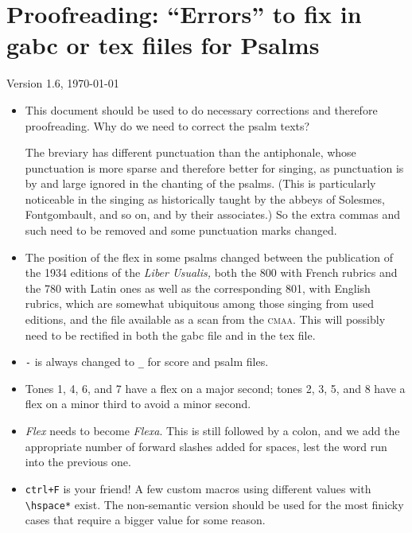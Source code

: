 \documentclass[11pt]{article}
\begin{document}
 \section{Proofreading: ``Errors'' to fix in gabc or tex fiiles for Psalms}
 
 {\centering Version 1.6, \today\par}
 
\begin{itemize}
 \item
 This document should be used to do necessary corrections and therefore proofreading. Why do we need to correct the psalm texts?
 
The breviary has different punctuation than the antiphonale, whose punctuation is more sparse and therefore better for singing, as punctuation is by and large ignored in the chanting of the psalms. (This is particularly noticeable in the singing as historically taught by the abbeys of Solesmes, Fontgombault, and so on, and by their associates.) So the extra commas and such need to be removed and some punctuation marks changed.
 
 \item
 The position of the flex in some psalms changed between the publication of the 1934 editions of the \textit{Liber Usualis,} both the 800 with French rubrics and the 780 with Latin ones as well as the corresponding 801, with English rubrics, which are somewhat ubiquitous among those singing from used editions, and the file available as a scan from the \textsc{cmaa}. This will possibly need to be rectified in both the gabc file and in the tex file.
 
 \item
 \verb|-| is always changed to \verb|_| for score and psalm files.
 
  \item
 
Tones 1, 4, 6, and 7 have a flex on a major second; tones 2, 3, 5, and 8 have a flex on a minor third to avoid a minor second.

 \item
 
\textit{Flex} needs to become \textit{Flexa}. This is still followed by a colon, and we add the appropriate number of forward slashes added for spaces, lest the word run into the previous one. 

 \item
\texttt{ctrl+F} is your friend! A few custom macros using different values with  \verb|\hspace*| exist. The non-semantic version should be used for the most finicky cases that require a bigger value for some reason.


\end{itemize}
\end{document}
